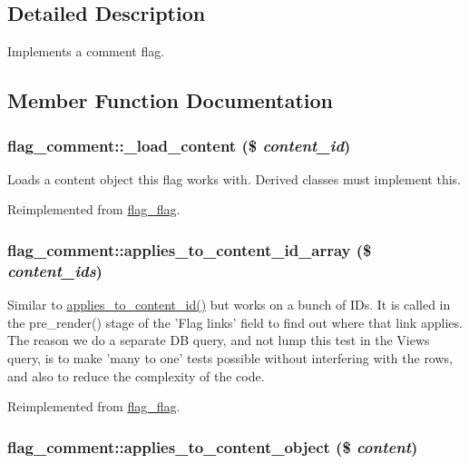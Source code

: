 \subsection{Detailed Description}
Implements a comment flag. 

\subsection{Member Function Documentation}
\hypertarget{classflag__comment_a2d056f6b6e161f1cf0a6886b5b7326b}{
\subsubsection[{\_\-load\_\-content}]{\setlength{\rightskip}{0pt plus 5cm}flag\_\-comment::\_\-load\_\-content (\$ {\em content\_\-id})}}
\label{classflag__comment_a2d056f6b6e161f1cf0a6886b5b7326b}


Loads a content object this flag works with. Derived classes must implement this.

Reimplemented from \hyperlink{classflag__flag}{flag\_\-flag}.\hypertarget{classflag__comment_27a4b1110c52e7237c06dc6c3ad6c092}{
\subsubsection[{applies\_\-to\_\-content\_\-id\_\-array}]{\setlength{\rightskip}{0pt plus 5cm}flag\_\-comment::applies\_\-to\_\-content\_\-id\_\-array (\$ {\em content\_\-ids})}}
\label{classflag__comment_27a4b1110c52e7237c06dc6c3ad6c092}


Similar to \hyperlink{classflag__flag_a38afcc59d7d1ef028215521c6fcdc22}{applies\_\-to\_\-content\_\-id()} but works on a bunch of IDs. It is called in the pre\_\-render() stage of the 'Flag links' field to find out where that link applies. The reason we do a separate DB query, and not lump this test in the Views query, is to make 'many to one' tests possible without interfering with the rows, and also to reduce the complexity of the code. 

Reimplemented from \hyperlink{group__views_g7ffe2653803be84d2c2d21dea608a6da}{flag\_\-flag}.\hypertarget{classflag__comment_4941d3bede8159f596a40c6f8aea7b3b}{
\subsubsection[{applies\_\-to\_\-content\_\-object}]{\setlength{\rightskip}{0pt plus 5cm}flag\_\-comment::applies\_\-to\_\-content\_\-object (\$ {\em content})}}
\label{classflag__comment_4941d3bede8159f596a40c6f8aea7b3b}


